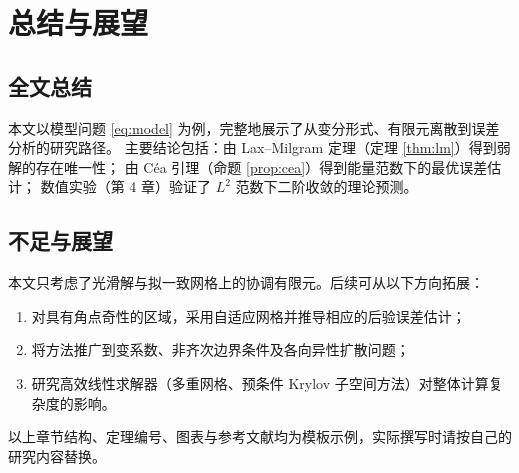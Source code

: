 \chapter{总结与展望}

\section{全文总结}

本文以模型问题 \eqref{eq:model} 为例，完整地展示了从变分形式、有限元离散到误差分析的研究路径。
主要结论包括：由 Lax--Milgram 定理（定理 \ref{thm:lm}）得到弱解的存在唯一性；
由 Céa 引理（命题 \ref{prop:cea}）得到能量范数下的最优误差估计；
数值实验（第 4 章）验证了 $L^2$ 范数下二阶收敛的理论预测。

\section{不足与展望}

本文只考虑了光滑解与拟一致网格上的协调有限元。后续可从以下方向拓展：

\begin{enumerate}[label=(\arabic*)]
  \item 对具有角点奇性的区域，采用自适应网格并推导相应的后验误差估计；
  \item 将方法推广到变系数、非齐次边界条件及各向异性扩散问题；
  \item 研究高效线性求解器（多重网格、预条件 Krylov 子空间方法）对整体计算复杂度的影响。
\end{enumerate}

以上章节结构、定理编号、图表与参考文献均为模板示例，实际撰写时请按自己的研究内容替换。
